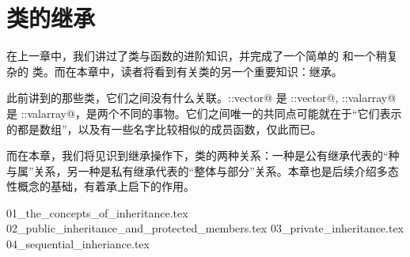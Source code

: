 \chapter{类的继承}
在上一章中，我们讲过了类与函数的进阶知识，并完成了一个简单的 \lstinline@valarri@ 和一个稍复杂的 \lstinline@string@ 类。而在本章中，读者将看到有关类的另一个重要知识：继承。\par
此前讲到的那些类，它们之间没有什么关联。\lstinline@std::vector@ 是 \lstinline@std::vector@, \lstinline@std::valarray@ 是 \lstinline@std::valarray@，是两个不同的事物。它们之间唯一的共同点可能就在于``它们表示的都是数组''，以及有一些名字比较相似的成员函数，仅此而已。\par
而在本章，我们将见识到继承操作下，类的两种关系：一种是公有继承代表的``种与属''关系，另一种是私有继承代表的``整体与部分''关系。本章也是后续介绍多态性概念的基础，有着承上启下的作用。\par
{01_the_concepts_of_inheritance.tex}
{02_public_inheritance_and_protected_members.tex}
{03_private_inheritance.tex}
{04_sequential_inheriance.tex}
